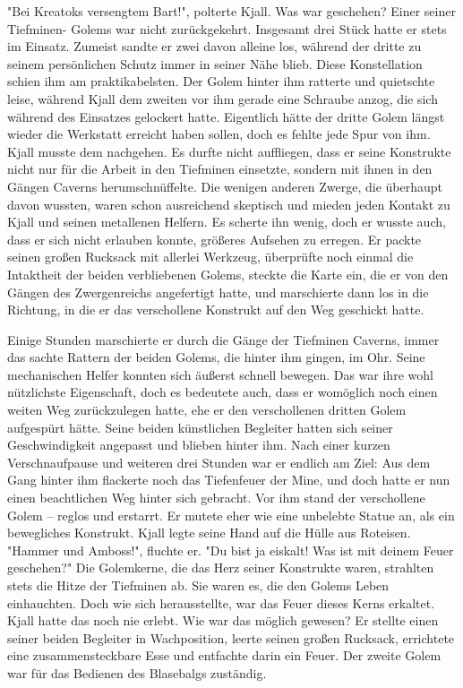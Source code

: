 \documentclass[10pt, a4paper, oneside]{book}
\begin{document}
\begin{multicols}{2}
"Bei Kreatoks versengtem Bart!", polterte Kjall. Was war geschehen? Einer seiner Tiefminen- Golems war nicht zurückgekehrt. Insgesamt drei Stück hatte er stets im Einsatz. Zumeist sandte er zwei davon alleine los, während der dritte zu seinem persönlichen Schutz immer in seiner Nähe blieb. Diese Konstellation schien ihm am praktikabelsten. Der Golem hinter ihm ratterte und quietschte leise, während Kjall dem zweiten vor ihm gerade eine Schraube anzog, die sich während des Einsatzes gelockert hatte. Eigentlich hätte der dritte Golem längst wieder die Werkstatt erreicht haben sollen, doch es fehlte jede Spur von ihm. Kjall musste dem nachgehen. Es durfte nicht auffliegen, dass er seine Konstrukte nicht nur für die Arbeit in den Tiefminen einsetzte, sondern mit ihnen in den Gängen Caverns herumschnüffelte. Die wenigen anderen Zwerge, die überhaupt davon wussten, waren schon ausreichend skeptisch und mieden jeden Kontakt zu Kjall und seinen metallenen Helfern. Es scherte ihn wenig, doch er wusste auch, dass er sich nicht erlauben konnte, größeres Aufsehen zu erregen. Er packte seinen großen Rucksack mit allerlei Werkzeug, überprüfte noch einmal die Intaktheit der beiden verbliebenen Golems, steckte die Karte ein, die er von den Gängen des Zwergenreichs angefertigt hatte, und marschierte dann los in die Richtung, in die er das verschollene Konstrukt auf den Weg geschickt hatte.\bigskip

Einige Stunden marschierte er durch die Gänge der Tiefminen Caverns, immer das sachte Rattern der beiden Golems, die hinter ihm gingen, im Ohr. Seine mechanischen Helfer konnten sich äußerst schnell bewegen. Das war ihre wohl nützlichste Eigenschaft, doch es bedeutete auch, dass er womöglich noch einen weiten Weg zurückzulegen hatte, ehe er den verschollenen dritten Golem aufgespürt hätte. Seine beiden künstlichen Begleiter hatten sich seiner Geschwindigkeit angepasst und blieben hinter ihm. Nach einer kurzen Verschnaufpause und weiteren drei Stunden war er endlich am Ziel: Aus dem Gang hinter ihm flackerte noch das Tiefenfeuer der Mine, und doch hatte er nun einen beachtlichen Weg hinter sich gebracht. Vor ihm stand der verschollene Golem – reglos und erstarrt. Er mutete eher wie eine unbelebte Statue an, als ein bewegliches Konstrukt. Kjall legte seine Hand auf die Hülle aus Roteisen. "Hammer und Amboss!", fluchte er. "Du bist ja eiskalt! Was ist mit deinem Feuer geschehen?" Die Golemkerne, die das Herz seiner Konstrukte waren, strahlten stets die Hitze der Tiefminen ab. Sie waren es, die den Golems Leben einhauchten. Doch wie sich herausstellte, war das Feuer dieses Kerns erkaltet. Kjall hatte das noch nie erlebt. Wie war das möglich gewesen? Er stellte einen seiner beiden Begleiter in Wachposition, leerte seinen großen Rucksack, errichtete eine zusammensteckbare Esse und entfachte darin ein Feuer. Der zweite Golem war für das Bedienen des Blasebalgs zuständig.\bigskip


\end{multicols}
\end{document}
